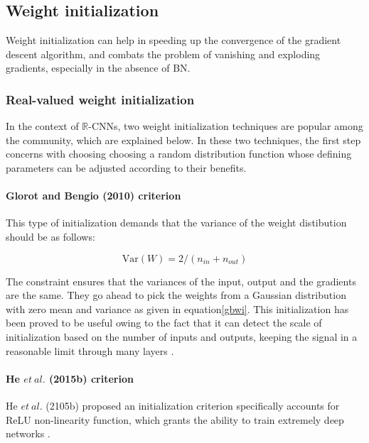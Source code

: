 
 \subsection{Weight initialization}
 Weight initialization can help in speeding up the convergence of the gradient descent algorithm, and combats the problem of vanishing and exploding gradients, especially in the absence of BN. 
 
 
 \subsubsection{Real-valued weight initialization}\label{rvwi}
 In the context of $\mathbb{R}$-CNNs, two weight initialization techniques are popular among the community, which are explained below. In these two techniques, the first step concerns with choosing choosing a random distribution function whose defining parameters can be adjusted according to their benefits.
 \paragraph{Glorot and Bengio (2010) criterion}
 This type of initialization demands that the variance of the weight distibution should be as follows:

  \begin{equation}\label{gbwi}
\mathrm{Var}(W) = 2/(n_{in}+n_{out})
\end{equation}
 
 The constraint ensures that the variances of the input, output and the gradients are the same. They go ahead to pick the weights from a Gaussian distribution with zero mean and variance as given in equation\ref{gbwi}. This initialization has been proved to be useful owing to the fact that it can detect the scale of initialization based on the number of inputs and outputs, keeping the signal in a reasonable limit through many layers \cite{recent_advances} \cite{glorot2010understanding}.
 
 
 \paragraph{He $et \ al.$ (2015b) criterion}
 He $et \ al.$ (2105b) proposed an initialization criterion specifically accounts for ReLU non-linearity function, which grants the ability to train extremely deep networks \cite{recent_advances} \cite{he2015delving}. 
 
 
 
